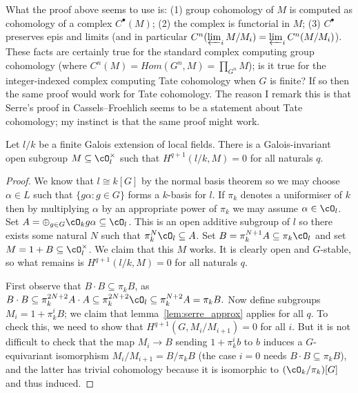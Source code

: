 \begin{remark} What the proof above seems to use is: (1) group cohomology of $M$ is computed
	as cohomology of a complex $C^\bullet(M)$; (2) the complex is functorial in $M$;
	(3) $C^\bullet$ preserves epis and limits (and in particular
	$C^n(\varprojlim_i M/M_i)=\varprojlim_i C^n(M/M_i)$).
	These facts are certainly true for the standard complex
	computing group cohomology (where $C^n(M)=Hom(G^n,M)=\prod_{G^n}M$); is it true for the
	integer-indexed complex computing Tate cohomology when $G$ is finite? If so then
	the same proof would work for Tate cohomology. The reason I remark this is that Serre's
	proof in Cassels--Froehlich seems to be a statement about Tate cohomology; my instinct
	is that the same proof might work.
\end{remark}

\begin{lemma}\label{lem:serre_cor}
	Let $l/k$ be a finite Galois extension of local fields.
	There is a Galois-invariant open subgroup $M \subseteq \cO_l^\times$
	such that $H^{q+1}(l/k,M)=0$ for all naturals $q$.
\end{lemma}
\begin{proof}
  We know that $l\cong k[G]$ by the normal basis theorem so we may choose $\alpha\in L$
	such that $\{g\alpha:g\in G\}$ forms a $k$-basis for $l$. If $\pi_k$ denotes a uniformiser of $k$
	then by multiplying $\alpha$ by an appropriate power of $\pi_k$ we may assume
	$\alpha\in\cO_l$. Set $A=\oplus_{g\in G}\cO_k g\alpha\subseteq\cO_l$. This is an
	open additive subgroup of $l$
	so there exists some natural $N$ such that $\pi_k^N\cO_l\subseteq A$. Set
	$B=\pi_k^{N+1}A\subseteq\pi_k\cO_l$ and set $M=1+B\subseteq \cO_l^\times$. We claim that this
	$M$ works. It is clearly open and $G$-stable, so what remains is $H^{q+1}(l/k,M)=0$
	for all naturals $q$.

	First observe that $B\cdot B\subseteq \pi_kB$, as $B\cdot B\subseteq\pi_k^{2N+2}A\cdot A
	\subseteq \pi_k^{2N+2}\cO_l\subseteq \pi_k^{N+2}A=\pi_kB.$ Now define subgroups
	$M_i=1+\pi_k^iB$; we claim that lemma~\ref{lem:serre_approx} applies for all $q$.
	To check this, we need to show that $H^{q+1}(G,M_i/M_{i+1})=0$ for all $i$. But
	it is not difficult
	to check that the map $M_i\to B$ sending $1+\pi_k^ib$ to $b$ induces a $G$-equivariant
	isomorphism $M_i/M_{i+1}=B/\pi_kB$ (the case $i=0$ needs $B\cdot B\subseteq \pi_kB$),
	and the latter has trivial cohomology because it is isomorphic to $(\cO_k/\pi_k)[G]$
	and thus induced.
\end{proof}

